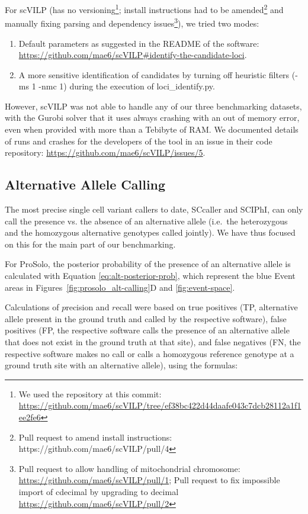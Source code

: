 \documentclass[authoryear,preprint,11pt]{scrartcl}
\begin{document}
For scVILP (has no versioning\footnote{We used the repository at this commit: \url{https://github.com/mae6/scVILP/tree/ef38bc422d44daafe043c7dcb28112a1f1ee2fe6}}; install instructions had to be amended\footnote{Pull request to amend install instructions: https://github.com/mae6/scVILP/pull/4} and manually fixing parsing and dependency issues\footnote{Pull request to allow handling of mitochondrial chromosome: \url{https://github.com/mae6/scVILP/pull/1}; Pull request to fix impossible import of {\ttfamily cdecimal} by upgrading to {\ttfamily decimal} \url{https://github.com/mae6/scVILP/pull/2}}), we tried two modes:
\begin{enumerate}
    \item Default parameters as suggested in the README of the software: \url{https://github.com/mae6/scVILP#identify-the-candidate-loci}.
    \item A more sensitive identification of candidates by turning off heuristic filters ({\ttfamily -ms 1 -nmc 1}) during the execution of {\ttfamily loci\_identify.py}.
\end{enumerate}
However, scVILP was not able to handle any of our three benchmarking datasets, with the Gurobi solver that it uses always crashing with an out of memory error, even when provided with more than a Tebibyte of RAM.
We documented details of runs and crashes for the developers of the tool in an issue in their code repository: \url{https://github.com/mae6/scVILP/issues/5}.

\subsection{Alternative Allele Calling}

The most precise single cell variant callers to date, SCcaller and SCIPhI, can only call the presence vs. the absence of an alternative allele (i.e.~the heterozygous and the homozygous alternative genotypes called jointly).
We have thus focused on this for the main part of our benchmarking.

For ProSolo, the posterior probability of the presence of an alternative allele is calculated with Equation \ref{eq:alt-posterior-prob}, which represent the blue Event areas in Figures~\ref{fig:prosolo_alt-calling}D and \ref{fig:event-space}.

Calculations of $p$recision and $r$ecall were based on true positives (TP, alternative allele present in the ground truth and called by the respective software), false positives (FP, the respective software calls the presence of an alternative allele that does not exist in the ground truth at that site), and false negatives (FN, the respective software makes no call or calls a homozygous reference genotype at a ground truth site with an alternative allele), using the formulas:
\end{document}
